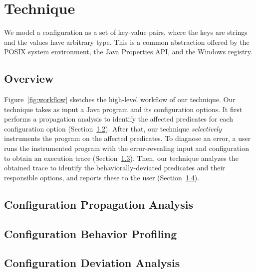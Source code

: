 \section{Technique}
\label{sec:technique}

We model a configuration as a set of key-value pairs, where
the keys are strings and the values have arbitrary type. This is
a common abstraction offered
by the POSIX system environment, the Java Properties API,
and the Windows registry.


\subsection{Overview}

Figure~\ref{fig:workflow} sketches the high-level workflow of our technique.
Our technique takes as input a Java program and its configuration options.
It first performs a propagation analysis to identify
the affected predicates for each configuration option (Section~\ref{sec:prop}).
After that, our technique \textit{selectively} instruments
the program on the affected predicates. 
To diagnose an error, a user runs the instrumented program
with the error-revealing input and configuration
to obtain an execution trace (Section~\ref{sec:profiling}).
Then, our technique analyzes the obtained trace
to identify the behaviorally-deviated predicates and their
responsible options, and reports these to the user (Section~\ref{sec:analysis}).




\subsection{Configuration Propagation Analysis}
\label{sec:prop}


\subsection{Configuration Behavior Profiling}
\label{sec:profiling}



\subsection{Configuration Deviation Analysis}
\label{sec:analysis}



